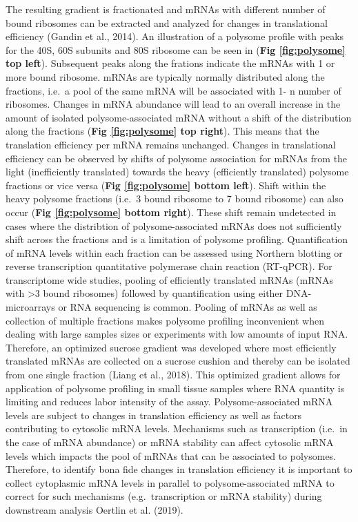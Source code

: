 \documentclass[
  12pt,
  openany]{book}
\begin{document}
The resulting gradient is fractionated and mRNAs with different number of bound ribosomes can be extracted and analyzed for changes in translational efficiency (Gandin et al., 2014). An illustration of a polysome profile with peaks for the 40S, 60S subunits and 80S ribosome can be seen in (\textbf{Fig \ref{fig:polysome} top left}). Subsequent peaks along the frations indicate the mRNAs with 1 or more bound ribosome. mRNAs are typically normally distributed along the fractions, i.e.~a pool of the same mRNA will be associated with 1- n number of ribosomes. Changes in mRNA abundance will lead to an overall increase in the amount of isolated polysome-associated mRNA without a shift of the distribution along the fractions (\textbf{Fig \ref{fig:polysome} top right}). This means that the translation efficiency per mRNA remains unchanged. Changes in translational efficiency can be observed by shifts of polysome association for mRNAs from the light (inefficiently translated) towards the heavy (efficiently translated) polysome fractions or vice versa (\textbf{Fig \ref{fig:polysome} bottom left}). Shift within the heavy polysome fractions (i.e.~3 bound ribosome to 7 bound ribosome) can also occur (\textbf{Fig \ref{fig:polysome} bottom right}). These shift remain undetected in cases where the distribtion of polysome-associated mRNAs does not sufficiently shift across the fractions and is a limitation of polysome profiling. Quantification of mRNA levels within each fraction can be assessed using Northern blotting or reverse transcription quantitative polymerase chain reaction (RT-qPCR).
For transcriptome wide studies, pooling of efficiently translated mRNAs (mRNAs with \textgreater3 bound ribosomes) followed by quantification using either DNA-microarrays or RNA sequencing is common. Pooling of mRNAs as well as collection of multiple fractions makes polysome profiling inconvenient when dealing with large samples sizes or experiments with low amounts of input RNA. Therefore, an optimized sucrose gradient was developed where most efficiently translated mRNAs are collected on a sucrose cushion and thereby can be isolated from one single fraction (Liang et al., 2018). This optimized gradient allows for application of polysome profiling in small tissue samples where RNA quantity is limiting and reduces labor intensity of the assay.
Polysome-associated mRNA levels are subject to changes in translation efficiency as well as factors contributing to cytosolic mRNA levels. Mechanisms such as transcription (i.e.~in the case of mRNA abundance) or mRNA stability can affect cytosolic mRNA levels which impacts the pool of mRNAs that can be associated to polysomes. Therefore, to identify bona fide changes in translation efficiency it is important to collect cytoplasmic mRNA levels in parallel to polysome-associated mRNA to correct for such mechanisms (e.g.~transcription or mRNA stability) during downstream analysis Oertlin et al. (2019).
\end{document}
